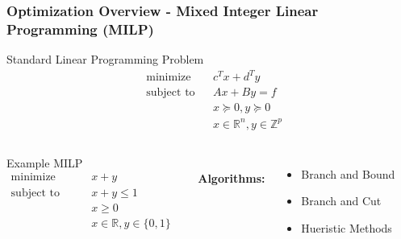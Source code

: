 \begin{frame}
    \frametitle{Optimization Overview - Mixed Integer Linear Programming (MILP)}
    \begin{block}{Standard Linear Programming Problem}
        \begin{align*}
            & \text{minimize} && c^T x + d^T y\\
            & \text{subject to} && A x + B y= f \\
            &                   && x \succeq 0, y \succeq 0 \\
            &                   && x \in \mathbb{R}^n, y \in \mathbb{Z}^p
        \end{align*}
    \end{block}

    \begin{columns}
          \begin{exampleblock}{Example MILP}
              \vspace{-0.7cm}
              \begin{align*}
                  \text{minimize} \qquad & x+y \\
                  \text{subject to} \quad \quad & x+y \leq 1 \\
                  \qquad \qquad & x \geq 0 \\
                  \qquad \qquad & x \in \mathbb{R}, y \in \{0,1\}
              \end{align*}
          \end{exampleblock}
      \ \\\
        \textbf{Algorithms:}
        \begin{itemize}
            \item Branch and Bound
            \item Branch and Cut
            \item Hueristic Methods
        \end{itemize}
      \end{columns}
\end{frame}

